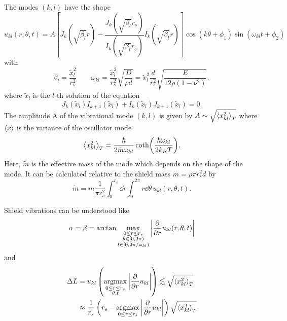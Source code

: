 The modes $(k,l)$ have the shape
\begin{equation}
  u_{kl}(r, \theta, t) = A\left[J_k(\sqrt{\beta_l}r) - \frac{J_k(\sqrt{\beta_l}r_s)}{I_k(\sqrt{\beta_l}r_s)}I_k(\sqrt{\beta_l}r)\right]\cos(k\theta+\phi_1)\sin(\omega_{kl}t+\phi_2)
\end{equation}
with
\begin{equation}
  \beta_l = \frac{\tilde{x}_l^2}{r_s^2} \quad \quad \omega_{kl} = \frac{\tilde{x}_l^2}{r_s^2}\sqrt{\frac{D}{\rho d}} = \tilde{x}_l^2\frac{d}{r_s^2}\sqrt{\frac{E}{12\rho(1-\nu^2)}} ,
\end{equation}
where $\tilde{x}_l$ is the $l$-th solution of the equation
\begin{equation}
  J_k(\tilde{x}_l)I_{k+1}(\tilde{x}_l)+I_k(\tilde{x}_l)J_{k+1}(\tilde{x}_l) = 0 .
\end{equation}
The amplitude A of the vibrational mode $(k,l)$ is given by $A \sim \sqrt{\left\langle x_{kl}^2\right\rangle_T}$ where $\left\langle x\right\rangle$ is the variance of the oscillator mode
\begin{equation}
  \left\langle x_{kl}^2\right\rangle_T = \frac{\hbar}{2\tilde{m}\omega_{kl}} \coth(\frac{\hbar \omega_{kl}}{2 k_B T}) .
\end{equation}
Here, $\tilde{m}$ is the effective mass of the mode which depends on the shape of the mode. It can be calculated relative to the shield mass $m=\rho \pi r_s^2 d$ by
\begin{equation}
  \tilde{m} = m\frac{1}{\pi r_s^2}\int_0^{r_s} \dd r \int_0^{2\pi} r\dd\theta \, u_{kl}(r, \theta, t) .
\end{equation}

Shield vibrations can be understood like
\begin{equation}
  \alpha = \beta = \arctan{\max_{\substack{0 \leq r \leq r_s \\ \theta \in[0, 2\pi) \\ t \in [0,2\pi/\omega_{kl})}} \left\lvert\pdv{r}u_{kl}(r,\theta,t)\right\rvert}
\end{equation}
and
\begin{align}
  \Delta L &= u_{kl}\left(\operatorname*{arg max}_{\substack{0 \leq r \leq r_s \\ \theta, t}} \left\lvert\pdv{r}u_{kl}\right\rvert \right) \lesssim \sqrt{\left\langle x_{kl}^2\right\rangle_T} \\
  &\approx \frac{1}{r_s} \left(r_s - \operatorname*{arg max}_{0 \leq r \leq r_s}\left\lvert\pdv{r}u_{kl}\right\rvert\right)\sqrt{\left\langle x_{kl}^2\right\rangle_T}
\end{align}
